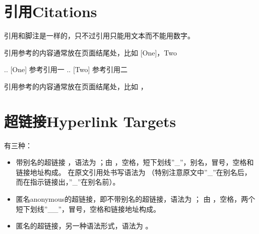 \documentclass[a4paper,10pt,english]{sphinxmanual}
\begin{document}
\section{引用Citations}
\label{\detokenize{reStructureText_syntax:citations}}
\sphinxAtStartPar
引用和脚注是一样的，只不过引用只能用文本而不能用数字。

\sphinxAtStartPar
{}

\begin{sphinxVerbatim}[commandchars=\\\{\}]
引用参考的内容通常放在页面结尾处，比如 [One]\PYGZus{}，Two\PYGZus{}

.. [One] 参考引用一
.. [Two] 参考引用二
\end{sphinxVerbatim}

\sphinxAtStartPar
{}

\sphinxAtStartPar
引用参考的内容通常放在页面结尾处，比如 ，


\section{超链接Hyperlink Targets}
\label{\detokenize{reStructureText_syntax:hyperlink-targets}}
\sphinxAtStartPar
{} 有三种：

\label{\detokenize{reStructureText_syntax:id36}}\begin{itemize}
\item {} 
\sphinxAtStartPar
带别名的超链接 ，语法为  ；由 ，空格，短下划线”\_”，别名，冒号，空格和链接地址构成。
在原文引用处书写语法为  （特别注意原文中”\_”在别名后，而在指示链接出，”\_”在别名前）。

\item {} 
\sphinxAtStartPar
匿名anonymous的超链接，即不带别名的超链接，语法为  ； 由 ，空格，两个短下划线”\_\_”，冒号，空格和链接地址构成。

\item {} 
\sphinxAtStartPar
匿名的超链接，另一种语法形式，语法为   。

\end{itemize}
\end{document}
